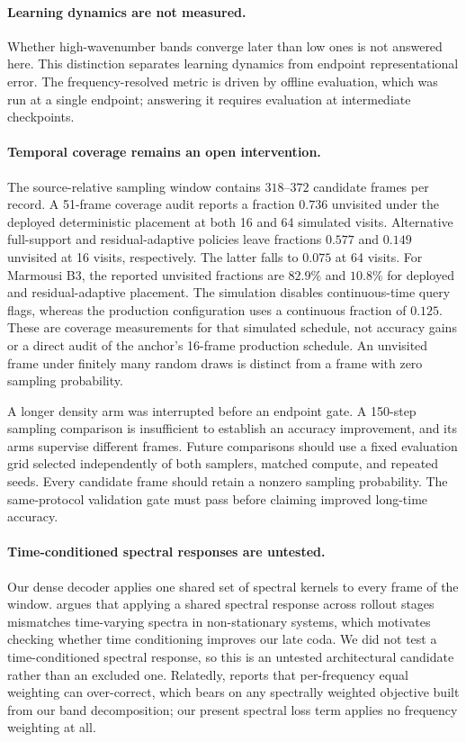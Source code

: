 \documentclass[11pt,a4paper]{article}
\begin{document}
\paragraph{Learning dynamics are not measured.} Whether high-wavenumber bands converge later
than low ones is not answered here. This distinction separates learning dynamics from
endpoint representational error. The frequency-resolved metric is driven by offline
evaluation, which was run at a single endpoint; answering it requires evaluation at
intermediate checkpoints.

\paragraph{Temporal coverage remains an open intervention.}
The source-relative sampling window contains $318$--$372$ candidate frames per record.
A 51-frame coverage audit reports a fraction $0.736$ unvisited under the deployed deterministic
placement at both 16 and 64 simulated visits. Alternative full-support and residual-adaptive
policies leave fractions $0.577$ and $0.149$ unvisited at 16 visits, respectively. The latter
falls to $0.075$ at 64 visits. For Marmousi B3, the reported unvisited fractions are $82.9\%$
and $10.8\%$ for deployed and residual-adaptive placement. The simulation disables continuous-time query flags, whereas the production configuration
uses a continuous fraction of $0.125$. These are coverage measurements for that simulated
schedule, not accuracy gains or a direct audit of the anchor's 16-frame production schedule. An unvisited frame under finitely many random draws is distinct from a
frame with zero sampling probability.

A longer density arm was interrupted before an endpoint gate. A 150-step sampling comparison is insufficient to establish an accuracy improvement, and its arms
supervise different frames. Future comparisons should use a fixed evaluation grid selected
independently of both samplers, matched compute, and repeated seeds. Every candidate frame
should retain a nonzero sampling probability. The same-protocol validation gate must pass
before claiming improved long-time accuracy.

\paragraph{Time-conditioned spectral responses are untested.}
Our dense decoder applies one shared set of spectral kernels to every frame of the window.
\cite{tfsno} argues that applying a shared spectral response across rollout stages mismatches
time-varying spectra in non-stationary systems, which motivates checking whether time conditioning improves our late coda. We did not test a time-conditioned spectral response, so this is an
untested architectural candidate rather than an excluded one. Relatedly, \cite{refinerspectral}
reports that per-frequency equal weighting can over-correct, which bears on any spectrally
weighted objective built from our band decomposition; our present spectral loss term applies no
frequency weighting at all.
\end{document}

